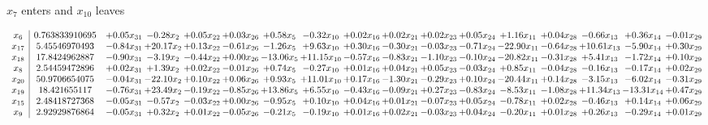 \documentclass[9pt]{article}
\begin{document}
 $ x_{7} $ enters and $ x_{10} $ leaves 

 \[\begin{array}{c| c c@{\hskip 2pt} c@{\hskip 2pt} c@{\hskip 2pt} c@{\hskip 2pt} c@{\hskip 2pt} c@{\hskip 2pt} c@{\hskip 2pt} c@{\hskip 2pt} c@{\hskip 2pt} c@{\hskip 2pt} c@{\hskip 2pt} c@{\hskip 2pt} c@{\hskip 2pt} c@{\hskip 2pt} c@{\hskip 2pt} }
 x_{6}   &  0.763833910695 & +  0.05 x_{31} & -0.28 x_{2} & +  0.05 x_{22} & +  0.03 x_{26} & +  0.58 x_{5} & -0.32 x_{10} & +  0.02 x_{16} & +  0.02 x_{21} & +  0.02 x_{23} & +  0.05 x_{24} & +  1.16 x_{11} & +  0.04 x_{28} & -0.66 x_{13} & +  0.36 x_{14} & -0.01 x_{29}\\
 x_{17}   &  5.45546970493 & -0.84 x_{31} & + 20.17 x_{2} & +  0.13 x_{22} & -0.61 x_{26} & -1.26 x_{5} & +  9.63 x_{10} & +  0.30 x_{16} & -0.30 x_{21} & -0.03 x_{23} & -0.71 x_{24} & -22.90 x_{11} & -0.64 x_{28} & + 10.61 x_{13} & -5.90 x_{14} & +  0.30 x_{29}\\
 x_{18}   &  17.8424962887 & -0.90 x_{31} & -3.19 x_{2} & -0.44 x_{22} & +  0.00 x_{26} & -13.06 x_{5} & + 11.15 x_{10} & -0.57 x_{16} & -0.83 x_{21} & -1.10 x_{23} & -0.10 x_{24} & -20.82 x_{11} & -0.31 x_{28} & +  5.41 x_{13} & -1.72 x_{14} & +  0.10 x_{29}\\
 x_{8}   &  2.54459472896 & +  0.02 x_{31} & +  1.39 x_{2} & +  0.02 x_{22} & -0.01 x_{26} & +  0.74 x_{5} & -0.27 x_{10} & +  0.01 x_{16} & +  0.04 x_{21} & +  0.05 x_{23} & -0.03 x_{24} & +  0.85 x_{11} & -0.04 x_{28} & -0.16 x_{13} & -0.17 x_{14} & +  0.02 x_{29}\\
 x_{20}   &  50.9706654075 & -0.04 x_{31} & -22.10 x_{2} & +  0.10 x_{22} & +  0.06 x_{26} & +  0.93 x_{5} & + 11.01 x_{10} & +  0.17 x_{16} & -1.30 x_{21} & -0.29 x_{23} & +  0.10 x_{24} & -20.44 x_{11} & +  0.14 x_{28} & -3.15 x_{13} & -6.02 x_{14} & -0.31 x_{29}\\
 x_{19}   &  18.421655117 & -0.76 x_{31} & + 23.49 x_{2} & -0.19 x_{22} & -0.85 x_{26} & + 13.86 x_{5} & +  6.55 x_{10} & -0.43 x_{16} & -0.09 x_{21} & +  0.27 x_{23} & -0.83 x_{24} & -8.53 x_{11} & -1.08 x_{28} & + 11.34 x_{13} & -13.31 x_{14} & +  0.47 x_{29}\\
 x_{15}   &  2.48418727368 & -0.05 x_{31} & -0.57 x_{2} & -0.03 x_{22} & +  0.00 x_{26} & -0.95 x_{5} & +  0.10 x_{10} & +  0.04 x_{16} & +  0.01 x_{21} & -0.07 x_{23} & +  0.05 x_{24} & -0.78 x_{11} & +  0.02 x_{28} & -0.46 x_{13} & +  0.14 x_{14} & +  0.06 x_{29}\\
 x_{9}   &  2.92929876864 & -0.05 x_{31} & +  0.32 x_{2} & +  0.01 x_{22} & -0.05 x_{26} & -0.21 x_{5} & -0.19 x_{10} & +  0.01 x_{16} & +  0.02 x_{21} & -0.03 x_{23} & +  0.04 x_{24} & -0.20 x_{11} & +  0.01 x_{28} & +  0.26 x_{13} & -0.29 x_{14} & +  0.01 x_{29}\\

\end{array}\]
\end{document}
